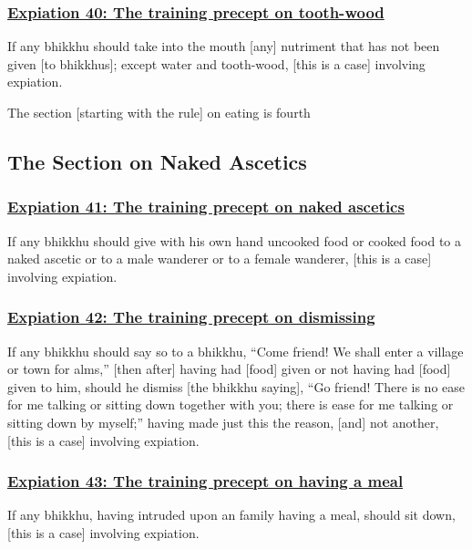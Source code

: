\subsubsection*{\hyperref[pac40]{Expiation 40: The training precept on tooth-wood}}
\label{exp40}
If any bhikkhu should take into the mouth [any] nutriment that has not been given [to bhikkhus]; except water and tooth-wood, [this is a case] involving expiation.

\begin{center}
  The section [starting with the rule] on eating is fourth
\end{center}

\setsubsecheadstyle{\subsectionFmt}
\subsection{The Section on Naked Ascetics}
\vspace{0.2cm}

\subsubsection*{\hyperref[pac41]{Expiation 41: The training precept on naked ascetics}}
\label{exp41}
If any bhikkhu should give with his own hand uncooked food or cooked food to a naked ascetic or to a male wanderer or to a female wanderer, [this is a case] involving expiation.

\subsubsection*{\hyperref[pac42]{Expiation 42: The training precept on dismissing}}
\label{exp42}
If any bhikkhu should say so to a bhikkhu, ``Come friend! We shall enter a village or town for alms,'' [then after] having had [food] given or not having had [food] given to him, should he dismiss [the bhikkhu saying], ``Go friend! There is no ease for me talking or sitting down together with you; there is ease for me talking or sitting down by myself;'' having made just this the reason, [and] not another, [this is a case] involving expiation.

\subsubsection*{\hyperref[pac43]{Expiation 43: The training precept on having a meal}}
\label{exp43}
If any bhikkhu, having intruded upon an family having a meal, should sit down, [this is a case] involving expiation.

